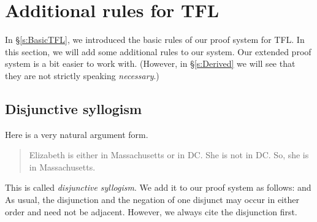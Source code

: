 \chapter{Additional rules for TFL}\label{s:Further}
In \S\ref{s:BasicTFL}, we introduced the basic rules of our proof system for TFL. In this section, we will add some additional rules to our system. Our extended proof system is a bit easier to work with. (However, in \S\ref{s:Derived} we will see that they are not strictly speaking \emph{necessary}.)


\section{Disjunctive syllogism}
Here is a very natural argument form.
	\begin{quote}
		Elizabeth is either in Massachusetts or in DC. She is not in DC. So, she is in Massachusetts.
	\end{quote}
This is called \emph{disjunctive syllogism}. We add it to our proof system as follows:
and
As usual, the disjunction and the negation of one disjunct may occur in either order and need not be adjacent. However, we always cite the disjunction first. 

